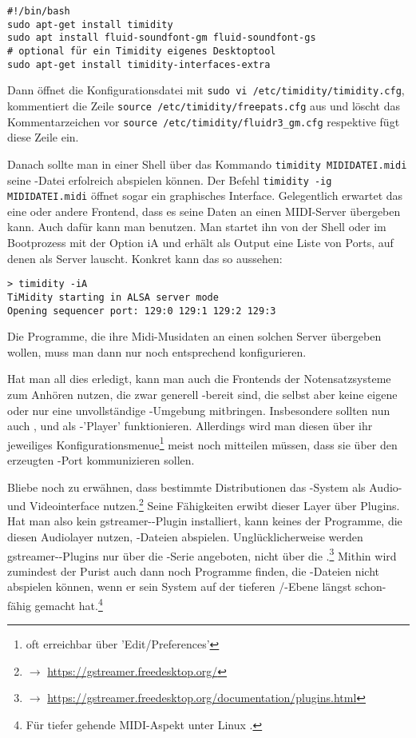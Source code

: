 \begin{verbatim}
#!/bin/bash
sudo apt-get install timidity
sudo apt install fluid-soundfont-gm fluid-soundfont-gs
# optional für ein Timidity eigenes Desktoptool
sudo apt-get install timidity-interfaces-extra
\end{verbatim}

Dann öffnet die Konfigurationsdatei mit \texttt{sudo vi /etc/timidity/timidity.cfg}, kommentiert die Zeile \texttt{source /etc/timidity/freepats.cfg} aus und löscht das Kommen\-tar\-zeichen vor \texttt{source /etc/timidity/fluidr3\_gm.cfg} respektive fügt diese Zeile ein.

Danach sollte man in einer Shell über das Kommando \texttt{timidity
MIDIDATEI.midi} seine -Datei erfolreich abspielen können. Der Befehl
\texttt{timidity -ig MIDIDATEI.midi} öffnet sogar ein graphisches Interface.
Gelegentlich erwartet das eine oder andere Frontend, dass es seine Daten an
einen MIDI-Server übergeben kann. Auch dafür kann man  benutzen.
Man startet ihn von der Shell oder im Bootprozess mit der Option {iA} und erhält
als Output eine Liste von Ports, auf denen  als Server lauscht.
Konkret kann das so aussehen:
\begin{verbatim}
> timidity -iA
TiMidity starting in ALSA server mode
Opening sequencer port: 129:0 129:1 129:2 129:3
\end{verbatim}
Die Programme, die ihre Midi-Musidaten an einen solchen Server übergeben wollen,
muss man dann nur noch entsprechend konfigurieren.

Hat man all dies erledigt, kann man auch die Frontends der Notensatzsysteme zum
Anhören nutzen, die zwar generell -bereit sind, die selbst aber keine
eigene oder nur eine unvollständige -Umgebung mitbringen. Insbesondere
sollten nun auch ,  und  als
-'Player' funktionieren. Allerdings wird man diesen über ihr
jeweiliges Konfigurationsmenue\footnote{oft erreichbar über 'Edit/Preferences'}
meist noch mitteilen müssen, dass sie über den erzeugten -Port
kommunizieren sollen.

Bliebe noch zu erwähnen, dass bestimmte Distributionen das
-System als Audio- und Videointerface
nutzen.\footnote{$\rightarrow$
\href{https://gstreamer.freedesktop.org/}{https://gstreamer.freedesktop.org/}}
Seine Fähigkeiten erwibt dieser Layer über Plugins. Hat man also kein
gstreamer--Plugin
 installiert, kann keines der Programme, die diesen Audiolayer nutzen,
 -Dateien abspielen. Unglücklicherweise werden
 gstreamer--Plugins nur über die
 -Serie angeboten, nicht über die
 .\footnote{$\rightarrow$
 \href{https://gstreamer.freedesktop.org/documentation/plugins.html}
 {https://gstreamer.freedesktop.org/documentation/plugins.html}} Mithin wird
 zumindest der Purist auch dann noch Programme finden, die -Dateien
 nicht abspielen können, wenn er sein System auf der tieferen
 /-Ebene längst schon-fähig gemacht
 hat.\footnote{Für tiefer gehende MIDI-Aspekt unter Linux \cite[vgl.][\nopage
 wp.]{Felix2018a}.}

% 
